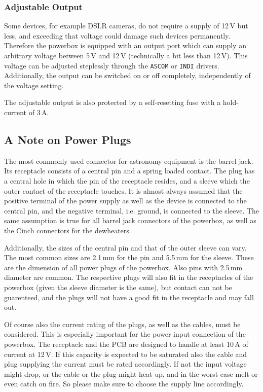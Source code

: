 \documentclass{scrartcl}
\begin{document}
\subsubsection{Adjustable Output}
Some devices, for example DSLR cameras, do not require a supply of 12\,V but
less, and exceeding that voltage could damage such devices permanently.
Therefore the powerbox is equipped with an output port which can supply an
arbitrary voltage between 5\,V and 12\,V (technically a bit less than 12\,V).
This voltage can be adjusted steplessly through the \texttt{ASCOM} or
\texttt{INDI} drivers. Additionally, the output can be switched on or off
completely, independently of the voltage setting.

The adjustable output is also protected by a self-resetting fuse with a
hold-current of 3\,A.

\subsection{A Note on Power Plugs}
The most commonly used connector for astronomy equipment is the barrel jack. Its
receptacle consists of a central pin and a spring loaded contact. The plug has a
central hole in which the pin of the receptacle resides, and a sleeve which the
outer contact of the receptacle touches. It is almost always assumed that the
positive terminal of the power supply as well as the device is connected to the
central pin, and the negative terminal, i.e. ground, is connected to the sleeve.
The same assumption is true for all barrel jack connectors of the powerbox, as
well as the Cinch connectors for the dewheaters.

Additionally, the sizes of the central pin and that of the outer sleeve can
vary. The most common sizes are 2.1\,mm for the pin and 5.5\,mm for the sleeve.
These are the dimension of all power plugs of the powerbox. Also pins with
2.5\,mm diameter are common. The respective plugs will also fit in the
receptacles of the powerbox (given the sleeve diameter is the same), but contact
can not be guarenteed, and the plugs will not have a good fit in the receptacle
and may fall out.

Of course also the current rating of the plugs, as well as the cables, must be
considered. This is especially important for the power input connection of the
powerbox. The receptacle and the PCB are designed to handle at least 10\,A of
current at 12\,V. If this capacity is expected to be saturated also the cable
and plug supplying the current must be rated accordingly. If not the input
voltage might drop, or the cable or the plug might heat up, and in the worst
case melt or even catch on fire. So please make sure to choose the supply line
accordingly.
\end{document}
